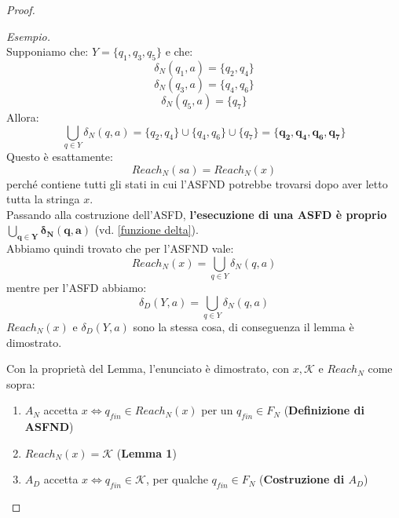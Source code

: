 \begin{proof}
\begin{itemize}[label=--]
    \noindent \textit{Esempio.}\\
    Supponiamo che: $Y=\{q_1,q_3,q_5\}$ e che:
\[
\delta_N(q_1,a)=\{q_2,q_4\}
\]\[
\delta_N(q_3,a)=\{q_4,q_6\}
\]\[
\delta_N(q_5,a)=\{q_7\}
\]Allora:
\[
\bigcup_{q\in Y}\delta_N(q,a)
=
\{q_2,q_4\}\cup\{q_4,q_6\}\cup\{q_7\} =\bm{\{q_2,q_4,q_6,q_7\}}
\]
Questo è esattamente:
\[
Reach_N(sa)=Reach_N(x)
\]
perché contiene tutti gli stati in cui l'ASFND potrebbe trovarsi dopo aver letto tutta la stringa \(x\).\smallskip\\
\noindent Passando alla costruzione dell'ASFD, \textbf{l'esecuzione di una ASFD è proprio} $\bm{\bigcup_{q\in Y}\delta_N(q,a)}$ (vd. \ref{funzione delta}).\\
Abbiamo quindi trovato che per l'ASFND vale:
\[
Reach_N(x)
=
\bigcup_{q\in Y}\delta_N(q,a)
\]mentre per l'ASFD abbiamo:
\[
\delta_D(Y,a)
=
\bigcup_{q\in Y}\delta_N(q,a)
\]
$Reach_N(x)$ e $\delta_D(Y,a)$ sono la stessa cosa, di conseguenza il lemma è dimostrato.

\end{itemize} 
Con la proprietà del Lemma, l'enunciato è dimostrato, con \(x, \mathcal{K}\) e \(Reach_N\) come sopra:
\begin{enumerate}
    \item \(A_N\) accetta \(x \Leftrightarrow q_{fin} \in Reach_N(x)\) per un \(q_{fin} \in F_N\) ({\textbf{Definizione di ASFND}})
    \item \(Reach_N(x) = \mathcal{K}\) ({\textbf{Lemma 1}})
    \item \(A_D\) accetta \(x \Leftrightarrow q_{fin} \in \mathcal{K}\), per qualche \(q_{fin} \in F_N\) ({\textbf{Costruzione di \(A_D\)}})
\end{enumerate}


\end{proof}

